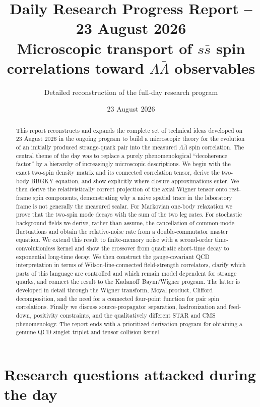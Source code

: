 \documentclass[11pt]{article}
\title{\textbf{Daily Research Progress Report -- 23 August 2026}\\
Microscopic transport of $s\bar s$ spin correlations toward $\Lambda\bar\Lambda$ observables}
\author{Detailed reconstruction of the full-day research program}
\date{23 August 2026}
\begin{document}
\maketitle

\begin{abstract}
This report reconstructs and expands the complete set of technical ideas developed on 23 August 2026 in the ongoing program to build a microscopic theory for the evolution of an initially produced strange-quark pair into the measured $\Lambda\bar\Lambda$ spin correlation. The central theme of the day was to replace a purely phenomenological ``decoherence factor'' by a hierarchy of increasingly microscopic descriptions. We begin with the exact two-spin density matrix and its connected correlation tensor, derive the two-body BBGKY equation, and show explicitly where closure approximations enter. We then derive the relativistically correct projection of the axial Wigner tensor onto rest-frame spin components, demonstrating why a naive spatial trace in the laboratory frame is not generally the measured scalar. For Markovian one-body relaxation we prove that the two-spin mode decays with the sum of the two leg rates. For stochastic background fields we derive, rather than assume, the cancellation of common-mode fluctuations and obtain the relative-noise rate from a double-commutator master equation. We extend this result to finite-memory noise with a second-order time-convolutionless kernel and show the crossover from quadratic short-time decay to exponential long-time decay. We then construct the gauge-covariant QCD interpretation in terms of Wilson-line-connected field-strength correlators, clarify which parts of this language are controlled and which remain model dependent for strange quarks, and connect the result to the Kadanoff--Baym/Wigner program. The latter is developed in detail through the Wigner transform, Moyal product, Clifford decomposition, and the need for a connected four-point function for pair spin correlations. Finally we discuss source-propagator separation, hadronization and feed-down, positivity constraints, and the qualitatively different STAR and CMS phenomenology. The report ends with a prioritized derivation program for obtaining a genuine QCD singlet-triplet and tensor collision kernel.
\end{abstract}

\tableofcontents
\newpage

\section{Research questions attacked during the day}
\end{document}
